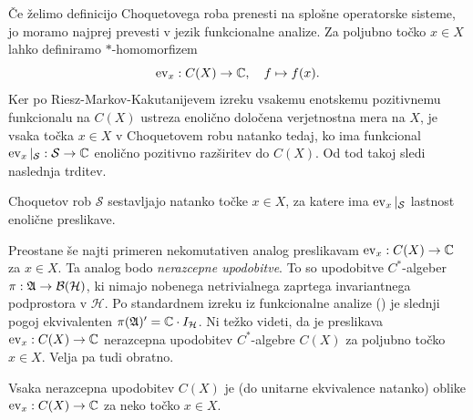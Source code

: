 Če želimo definicijo Choquetovega roba prenesti na splošne operatorske sisteme,
jo moramo najprej prevesti v jezik funkcionalne analize.
Za poljubno točko $x \in X$ lahko definiramo $*$-homomorfizem 
$$\operatorname{ev}_x: C(X) \to \mathbb C,\quad f \mapsto f(x).$$
Ker po Riesz-Markov-Kakutanijevem izreku vsakemu enotskemu pozitivnemu funkcionalu na $C(X)$
ustreza enolično določena verjetnostna mera na $X$, 
je vsaka točka $x \in X$ v Choquetovem robu natanko tedaj, ko ima funkcional $\operatorname{ev}_x |_{\mathcal{S}}: \mathcal{S} \to \mathbb C$
enolično pozitivno razširitev do $C(X)$.
Od tod takoj sledi naslednja trditev.

\begin{trditev}
    Choquetov rob $\mathcal{S}$ sestavljajo natanko točke $x \in X$, za katere ima $\operatorname{ev}_x |_{\mathcal{S}}$ lastnost enolične preslikave.
\end{trditev}


Preostane še najti primeren nekomutativen analog preslikavam $\operatorname{ev}_x :C(X) \to \mathbb C$ za $x \in X$.
Ta analog bodo \emph{nerazcepne upodobitve}. To so upodobitve $C^*$-algeber $\pi: \mathfrak{A} \to \operatorname{\mathcal{B} (\mathcal{H})}$,
ki nimajo nobenega netrivialnega zaprtega invariantnega podprostora v $\mathcal{H}$.
Po standardnem izreku iz funkcionalne analize (\cite[Theorem 5.1.5., str. 143]{murphy1990}) je slednji pogoj ekvivalenten $\pi(\mathfrak{A}) ' = \mathbb C \cdot I_{\mathcal{H}}$.
Ni težko videti, da je preslikava $\operatorname{ev}_x: C(X) \to \mathbb C$ nerazcepna upodobitev $C^*$-algebre $C(X)$ za poljubno točko $x \in X$.
Velja pa tudi obratno.

\begin{trditev}
    Vsaka nerazcepna upodobitev $C(X)$ je (do unitarne ekvivalence natanko) oblike $\operatorname{ev}_x : C(X) \to \mathbb C$
    za neko točko $x \in X$.
\end{trditev}

